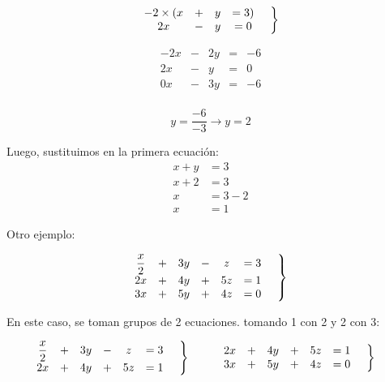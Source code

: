     \begin{equation*}
        \left.
        \begin{matrix}
            -2\times(x &+& y &=3)\\
            2x &-& y &=0
        \end{matrix}
        \hspace*{0.5cm}\right\rbrace
    \end{equation*}

    \begin{equation*}
        \begin{matrix}
            -2x &-& 2y &=&-6\\
            2x &-& y &=&0\\
            \hline
            0x &-& 3y &=&-6\\
        \end{matrix}
    \end{equation*}


    $$ y=\frac{-6}{-3} \rightarrow y=2 $$

    Luego, sustituimos en la primera ecuación:
    \begin{align*}
        x+y &=3 \\
        x+2 &=3 \\
        x&=3-2\\
        x&=1
    \end{align*}

    Otro ejemplo:

   \begin{equation*}
        \left.
        \begin{matrix}
            \displaystyle\frac{x}{2} &+& 3y &-& z &= 3 \\
            2x &+& 4y &+&5z &= 1\\
            3x &+& 5y &+& 4z &=0
        \end{matrix}
        \hspace*{0.5cm}\right\rbrace
    \end{equation*}


    En este caso, se toman grupos de 2 ecuaciones. tomando 1 con 2 y 2 con 3:

   \begin{align*}
        \left.
        \begin{matrix}
            \displaystyle\frac{x}{2} &+& 3y &-& z &= 3 \\
            2x &+& 4y &+&5z &= 1\\
        \end{matrix}
        \hspace*{0.5cm}\right\rbrace\hspace*{1cm}&
        \left.
        \begin{matrix}
            2x &+& 4y &+&5z &= 1\\
            3x &+& 5y &+& 4z &=0
        \end{matrix}
        \hspace*{0.5cm}\right\rbrace
    \end{align*}

